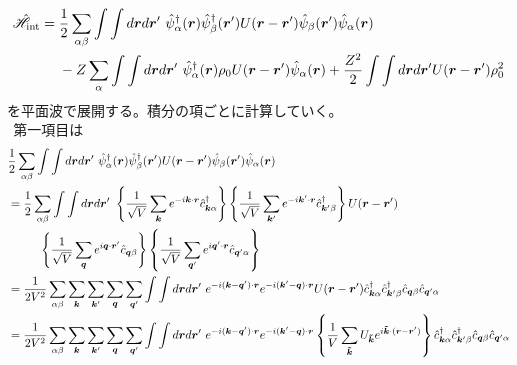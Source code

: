 \documentclass[dvipdfmx, 11pt, a4paper]{jsarticle}
\theoremstyle{definition}
\numberwithin{equation}{section}
\begin{document}
    \begin{derivationBox}
        \begin{align}
            \hat{\mathscr{H}}_{\text{int}} &= \frac{1}{2}\sum_{\alpha \beta} \int \int d\bm{r} d\bm{r}'\ \hat{\psi}_\alpha^\dagger(\bm{r}) \hat{\psi}^\dagger_{\beta}(\bm{r}')U(\bm{r}-\bm{r}')\hat{\psi}_\beta(\bm{r}')\hat{\psi}_\alpha(\bm{r})\notag \\ 
            &\ \ \ \ -Z\sum_\alpha \int \int d\bm{r} d\bm{r}'\ \hat{\psi}^\dagger_\alpha(\bm{r}) \rho_0 U(\bm{r}-\bm{r}') \hat{\psi}_{\alpha}(\bm{r}) + \frac{Z^2}{2} \int \int d\bm{r} d\bm{r}' U(\bm{r}-\bm{r}')\rho_0^2
        \end{align}
        を平面波で展開する。積分の項ごとに計算していく。\\
        $\ \ $第一項目は
        \begin{align}
            &\frac{1}{2}\sum_{\alpha \beta} \int \int d\bm{r} d\bm{r}'\ \hat{\psi}_\alpha^\dagger(\bm{r}) \hat{\psi}^\dagger_{\beta}(\bm{r}')U(\bm{r}-\bm{r}')\hat{\psi}_\beta(\bm{r}')\hat{\psi}_\alpha(\bm{r}) \notag \\
            &= \frac{1}{2}\sum_{\alpha \beta} \int \int d\bm{r} d\bm{r}'\ \left\{ \frac{1}{\sqrt{V}}\sum_{\bm{k}}e^{-i\bm{k}\cdot \bm{r}}\hat{c}^\dagger_{\bm{k}\alpha} \right\} \left\{ \frac{1}{\sqrt{V}}\sum_{\bm{k}'}e^{-i\bm{k}'\cdot \bm{r}}\hat{c}^\dagger_{\bm{k}'\beta} \right\}U(\bm{r}-\bm{r}')\notag \\
            &\ \ \ \ \ \ \ \ \left\{ \frac{1}{\sqrt{V}}\sum_{\bm{q}}e^{i\bm{q}\cdot \bm{r}'}\hat{c}_{\bm{q}\beta} \right\}\left\{ \frac{1}{\sqrt{V}}\sum_{\bm{q}'}e^{i\bm{q}'\cdot \bm{r}}\hat{c}_{\bm{q}'\alpha} \right\} \notag \\
            &= \frac{1}{2V^2}\sum_{\alpha \beta} \sum_{\bm{k}} \sum_{\bm{k}'} \sum_{\bm{q}} \sum_{\bm{q}'}\int \int d\bm{r} d\bm{r}'\  e^{-i(\bm{k}-\bm{q}')\cdot \bm{r}}  e^{-i(\bm{k}'-\bm{q})\cdot \bm{r}} U(\bm{r}-\bm{r}') \hat{c}^\dagger_{\bm{k}\alpha}\hat{c}^\dagger_{\bm{k}'\beta} \hat{c}_{\bm{q}\beta} \hat{c}_{\bm{q}'\alpha} \notag \\
            &= \frac{1}{2V^2}\sum_{\alpha \beta} \sum_{\bm{k}} \sum_{\bm{k}'} \sum_{\bm{q}} \sum_{\bm{q}'}\int \int d\bm{r} d\bm{r}'\  e^{-i(\bm{k}-\bm{q}')\cdot \bm{r}}  e^{-i(\bm{k}'-\bm{q})\cdot \bm{r}} \left\{ \frac{1}{V}\sum_{\bm{\tilde{k}}} U_{\bm{\tilde{k}}} e^{i\bm{\tilde{k}}\cdot (\bm{r}-\bm{r}')} \right\}\hat{c}^\dagger_{\bm{k}\alpha}\hat{c}^\dagger_{\bm{k}'\beta} \hat{c}_{\bm{q}\beta} \hat{c}_{\bm{q}'\alpha}\notag \\

\end{align}
\end{derivationBox}
\end{document}
